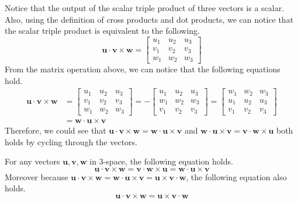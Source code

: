 \documentclass[../../../main.tex]{subfiles}
\begin{document}
Notice that the output of the scalar triple product of three
vectors is a scalar. Also, using the definition of cross products
and dot products, we can notice that the scalar triple product
is equivalent to the following.
\[
\mathbf{u} \cdot \mathbf{v} \times \mathbf{w}
=
\begin{bmatrix}
    u_1 & u_2 & u_3 \\
    v_1 & v_2 & v_3 \\
    w_1 & w_2 & w_3
\end{bmatrix}
\]
From the matrix operation above, we can notice that the following
equations hold.
\begin{align*}
    \mathbf{u} \cdot \mathbf{v} \times \mathbf{w}
    &= \begin{bmatrix}
        u_1 & u_2 & u_3 \\
        v_1 & v_2 & v_3 \\
        w_1 & w_2 & w_3
    \end{bmatrix}
    = -\begin{bmatrix}
        u_1 & u_2 & u_3 \\
        w_1 & w_2 & w_3 \\
        v_1 & v_2 & v_3
    \end{bmatrix}
    = \begin{bmatrix}
        w_1 & w_2 & w_3 \\
        u_1 & u_2 & u_3 \\
        v_1 & v_2 & v_3
    \end{bmatrix} \\
    &= \mathbf{w} \cdot \mathbf{u} \times \mathbf{v}
\end{align*}
Therefore, we could see that $\mathbf{u} \cdot \mathbf{v} \times
\mathbf{w} = \mathbf{w} \cdot \mathbf{u} \times \mathbf{v}$ and
$\mathbf{w} \cdot \mathbf{u} \times \mathbf{v} = \mathbf{v} \cdot
\mathbf{w} \times \mathbf{u}$ both holds by cycling through
the vectors.

\begin{important}
For any vectors $\mathbf{u}, \mathbf{v}, \mathbf{w}$ in 3-space,
the following equation holds.
\[
\mathbf{u} \cdot \mathbf{v} \times \mathbf{w}
= \mathbf{v} \cdot \mathbf{w} \times \mathbf{u}
= \mathbf{w} \cdot \mathbf{u} \times \mathbf{v}
\]
Moreover because $\mathbf{u} \cdot \mathbf{v} \times \mathbf{w}
= \mathbf{w} \cdot \mathbf{u} \times \mathbf{v}
= \mathbf{u} \times \mathbf{v} \cdot \mathbf{w}$, the following
equation also holds.
\[
\mathbf{u} \cdot \mathbf{v} \times \mathbf{w}
= \mathbf{u} \times \mathbf{v} \cdot \mathbf{w}
\]
\end{important}
\end{document}
